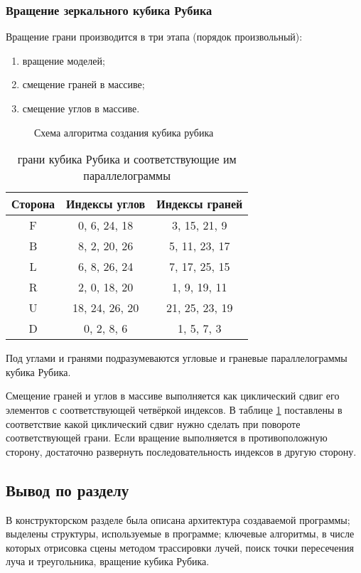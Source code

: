 \subsubsection{Вращение зеркального кубика Рубика}

Вращение грани производится в три этапа (порядок произвольный):
\begin{enumerate}
	\item вращение моделей;
	\item смещение граней в массиве;
	\item смещение углов в массиве.
\end{enumerate}

\begin{figure}[!ht]
	\caption{Схема алгоритма создания кубика рубика}
	\label{fig:rubicks_create}
\end{figure}
\begin{table}[!ht]
	\centering
	\caption{грани кубика Рубика и соответствующие им параллелограммы}
	\label{tabular:cube_indexes}
	\begin{tabular}{|c|c|c|}
		\hline
		Сторона & Индексы углов & Индексы граней \\
		\hline
		\hline
		F & 0, 6, 24, 18	& 3, 15, 21, 9		\\ \hline
		B & 8, 2, 20, 26	& 5, 11, 23, 17		\\ \hline
		L & 6, 8, 26, 24	& 7, 17, 25, 15		\\ \hline
		R & 2, 0, 18, 20	& 1, 9, 19, 11		\\ \hline
		U & 18, 24, 26, 20	& 21, 25, 23, 19	\\ \hline
		D & 0, 2, 8, 6		& 1, 5, 7, 3		\\ \hline
	\end{tabular}
\end{table}

Под углами и гранями подразумеваются угловые и граневые параллелограммы кубика Рубика.

Смещение граней и углов в массиве выполняется как циклический сдвиг его элементов с соответствующей четвёркой индексов. В таблице \ref{tabular:cube_indexes} поставлены в соответствие какой циклический сдвиг нужно сделать при повороте соответствующей грани. Если вращение выполняется в противоположную сторону, достаточно развернуть последовательность индексов в другую сторону.

\subsection{Вывод по разделу}
В конструкторском разделе была описана архитектура создаваемой программы;
выделены структуры, используемые в программе;
ключевые алгоритмы, в числе которых отрисовка сцены методом трассировки лучей,
поиск точки пересечения луча и треугольника, вращение кубика Рубика.

